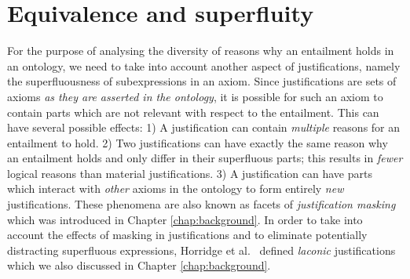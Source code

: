 



\section{Equivalence and superfluity}

For the purpose of analysing the diversity of reasons why an entailment holds in an ontology, we need to take into account another aspect of justifications, namely the superfluousness of subexpressions in an axiom. Since justifications are sets of axioms \emph{as they are asserted in the ontology}, it is possible for such an axiom to contain parts which are not relevant with respect to the entailment. This can have several possible effects: 1) A justification can contain \emph{multiple} reasons for an entailment to hold. 2) Two justifications can have exactly the same reason why an entailment holds and only differ in their superfluous parts; this results in \emph{fewer} logical reasons than material justifications. 3) A justification can have parts which interact with \emph{other} axioms in the ontology to form entirely \emph{new} justifications. These phenomena are also known as facets of \emph{justification masking} \cite{horridge10bg} which was introduced in Chapter \ref{chap:background}. In order to take into account the effects of masking in justifications and to eliminate potentially distracting superfluous expressions, Horridge et al.\ \cite{horridge08yi} defined \emph{laconic} justifications which we also discussed in Chapter \ref{chap:background}.

